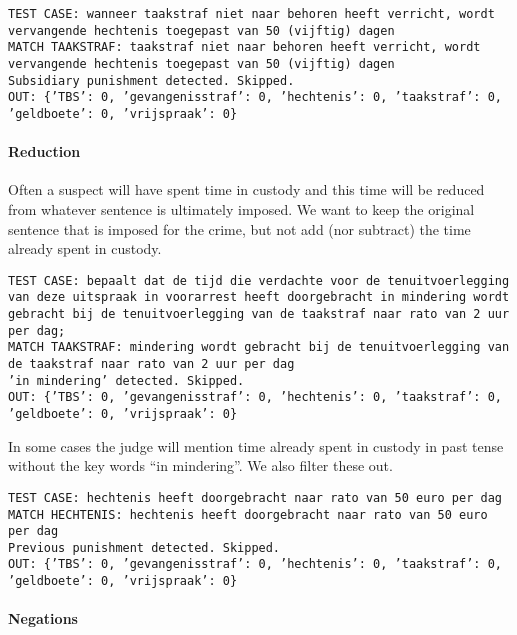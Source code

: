 \documentclass[a4paper]{article}
\begin{document}
\texttt{TEST CASE: %
wanneer taakstraf niet naar behoren heeft verricht, wordt vervangende hechtenis toegepast van 50 (vijftig) dagen\\
MATCH TAAKSTRAF: taakstraf niet naar behoren heeft verricht, wordt vervangende hechtenis toegepast van 50 (vijftig) dagen\\
Subsidiary punishment detected. Skipped.\\
OUT: \{'TBS': 0, 'gevangenisstraf': 0, 'hechtenis': 0, 'taakstraf': 0, 'geldboete': 0, 'vrijspraak': 0\}}

\paragraph{Reduction}

Often a suspect will have spent time in custody and this time will be reduced from whatever sentence is ultimately imposed.
We want to keep the original sentence that is imposed for the crime, but not add (nor subtract) the time already spent in custody.

\texttt{TEST CASE: %
bepaalt dat de tijd die verdachte voor de tenuitvoerlegging van deze uitspraak in voorarrest heeft doorgebracht in mindering wordt gebracht bij de tenuitvoerlegging van de taakstraf naar rato van 2 uur per dag;\\
MATCH TAAKSTRAF: mindering wordt gebracht bij de tenuitvoerlegging van de taakstraf naar rato van 2 uur per dag\\
'in mindering' detected. Skipped.\\
OUT: \{'TBS': 0, 'gevangenisstraf': 0, 'hechtenis': 0, 'taakstraf': 0, 'geldboete': 0, 'vrijspraak': 0\}}

In some cases the judge will mention time already spent in custody in past tense without the key words ``in mindering''.
We also filter these out.

\texttt{TEST CASE: %
hechtenis heeft doorgebracht naar rato van 50 euro per dag\\
MATCH HECHTENIS: hechtenis heeft doorgebracht naar rato van 50 euro per dag\\
Previous punishment detected. Skipped.\\
OUT: \{'TBS': 0, 'gevangenisstraf': 0, 'hechtenis': 0, 'taakstraf': 0, 'geldboete': 0, 'vrijspraak': 0\}}

\paragraph{Negations}
\end{document}
